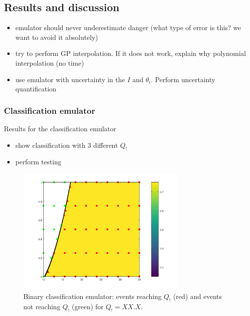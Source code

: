 \subsection{Results and discussion}

\begin{itemize}
\itemsep0em
  \item emulator should never underestimate danger (what type of error is this? we want to avoid it absolutely)
  \item try to perform GP interpolation. If it does not work, explain why polynomial interpolation (no time)
  \item use emulator with uncertainty in the $I$ and $\theta_i$. Perform uncertainty quantification
\end{itemize}


\subsubsection{Classification emulator}

Results for the classification emulator
\begin{itemize}
  \item show classification with 3 different $Q_!$
  \item perform testing 
\end{itemize}

\begin{figure}[htpb]
  \centering
  \includegraphics[width=0.75\textwidth]{Figures/classification.png}
  \caption{Binary classification emulator: events reaching $Q_!$ (red) and events not reaching $Q_!$ (green) for $Q_! = XX.X$.}
  \label{fig:classification_Q1}
\end{figure}


